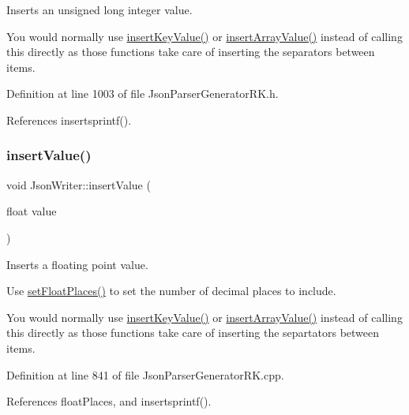 Inserts an unsigned long integer value. 

You would normally use \hyperlink{class_json_writer_ac2de627389b59ce2c8ed95e10ea213bf}{insert\+Key\+Value()} or \hyperlink{class_json_writer_a8b4dc6726b66b4f277c7674e60c8a057}{insert\+Array\+Value()} instead of calling this directly as those functions take care of inserting the separators between items. 

Definition at line 1003 of file Json\+Parser\+Generator\+R\+K.\+h.



References insertsprintf().

\mbox{\label{class_json_writer_a5651b6c191da0397dab40c5ad51af1ec}} 
\subsubsection{\texorpdfstring{insert\+Value()}{insertValue()}\hspace{0.1cm}{\footnotesize\ttfamily [6/9]}}
{\footnotesize\ttfamily void Json\+Writer\+::insert\+Value (\begin{DoxyParamCaption}\item[{float}]{value }\end{DoxyParamCaption})}



Inserts a floating point value. 

Use \hyperlink{class_json_writer_aecd4d984a49fe59b0c4d892fe6d1e791}{set\+Float\+Places()} to set the number of decimal places to include.

You would normally use \hyperlink{class_json_writer_ac2de627389b59ce2c8ed95e10ea213bf}{insert\+Key\+Value()} or \hyperlink{class_json_writer_a8b4dc6726b66b4f277c7674e60c8a057}{insert\+Array\+Value()} instead of calling this directly as those functions take care of inserting the separtators between items. 

Definition at line 841 of file Json\+Parser\+Generator\+R\+K.\+cpp.



References float\+Places, and insertsprintf().

\mbox{\label{class_json_writer_a5ccac7627d96f545498118340f7e5f75}} 
